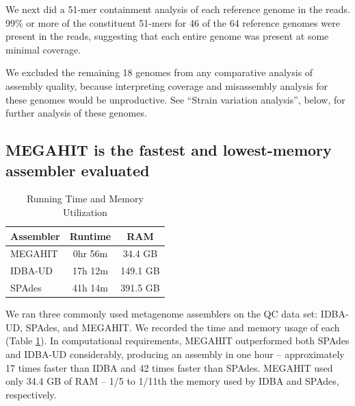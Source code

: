 \documentclass[10pt,a4paper,twocolumn]{article}
\begin{document}

We next did a 51-mer containment analysis of each reference genome in
the reads.  99\% or more of the constituent 51-mers for 46 of the 64
reference genomes were present in the reads, suggesting that each
entire genome was present at some  minimal coverage.

We excluded the remaining 18 genomes from any comparative
analysis of assembly quality, because interpreting coverage and
misassembly analysis for these genomes would be unproductive.  See
``Strain variation analysis'', below, for further analysis of these
genomes.



\subsection*{MEGAHIT is the fastest and lowest-memory assembler evaluated}

 \begin{table}[h]
\caption{Running Time and Memory Utilization}
\centering
\begin{tabular}{|l|c|c|}
\hline
\textbf{Assembler} & \textbf{Runtime} & \textbf{RAM} \\ [0.5ex]
\hline
MEGAHIT & 0hr 56m & 34.4 GB \\
\hline
IDBA-UD & 17h 12m & 149.1 GB \\
\hline
SPAdes & 41h 14m & 391.5 GB \\
\hline

\end{tabular}
\label{table:time-memory}
\end{table}

 We ran three commonly used metagenome assemblers on the QC data set:
IDBA-UD, SPAdes, and MEGAHIT. We recorded the time and memory usage of
each (Table \ref{table:time-memory}).  In computational requirements, MEGAHIT outperformed both
SPAdes and IDBA-UD considerably, producing an assembly in one hour --
approximately 17 times faster than IDBA and 42 times faster than
SPAdes.  MEGAHIT used only 34.4 GB of RAM -- 1/5 to 1/11th
the memory used by IDBA and SPAdes, respectively.
\end{document}
